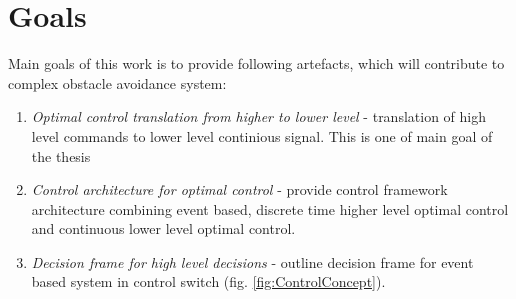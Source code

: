 \section{Goals}\noindent
Main goals of this work is to provide following artefacts, which will contribute to complex obstacle avoidance system:
\begin{enumerate}
    \item\textit{Optimal control translation from higher to lower level} - translation of high level commands to lower level continious signal. This is one of main goal of the thesis
    \item\textit{Control architecture for optimal control} - provide control framework architecture combining event based, discrete time higher level optimal control and continuous lower level optimal control.
    \item\textit{Decision frame for high level decisions} - outline decision frame for event based system in control switch (fig. \ref{fig:ControlConcept}).
\end{enumerate}
%		

